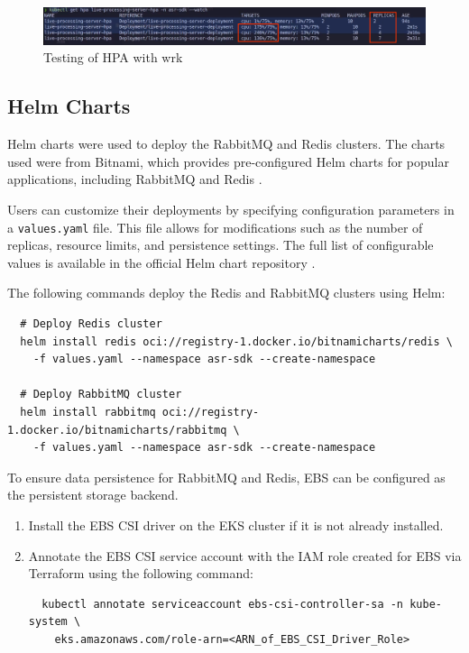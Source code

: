 \begin{figure}[!h]
  \centering
  \includegraphics[width=\textwidth]{figures/hpa_cli.png}
  \caption{Testing of HPA with wrk}
  \label{fig:hpa_cli}
\end{figure}

\subsection{Helm Charts}
Helm charts were used to deploy the RabbitMQ and Redis clusters. The charts used were from Bitnami, which provides pre-configured Helm charts for popular applications, including RabbitMQ \cite{rabbitmq_chart} and Redis \cite{redis_chart}.

Users can customize their deployments by specifying configuration parameters in a \texttt{values.yaml} file. This file allows for modifications such as the number of replicas, resource limits, and persistence settings. The full list of configurable values is available in the official Helm chart repository \cite{rabbitmq_chart, redis_chart}.


The following commands deploy the Redis and RabbitMQ clusters using Helm:
\begin{verbatim}
  # Deploy Redis cluster
  helm install redis oci://registry-1.docker.io/bitnamicharts/redis \
    -f values.yaml --namespace asr-sdk --create-namespace
  
  # Deploy RabbitMQ cluster
  helm install rabbitmq oci://registry-1.docker.io/bitnamicharts/rabbitmq \
    -f values.yaml --namespace asr-sdk --create-namespace
\end{verbatim}

To ensure data persistence for RabbitMQ and Redis, EBS can be configured as the persistent storage backend.
\begin{enumerate}
  \item Install the EBS CSI driver on the EKS cluster if it is not already installed.
  \item Annotate the EBS CSI service account with the IAM role created for EBS via Terraform using the following command:
  \begin{verbatim} 
  kubectl annotate serviceaccount ebs-csi-controller-sa -n kube-system \
    eks.amazonaws.com/role-arn=<ARN_of_EBS_CSI_Driver_Role>
  \end{verbatim}
\end{enumerate}

